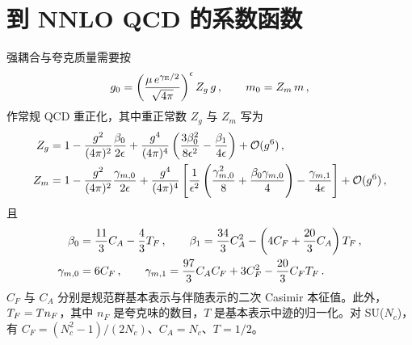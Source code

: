 \section{到 NNLO QCD 的系数函数}\label{sec:coefs}

强耦合与夸克质量需要按
\begin{equation}
  \begin{split}
    g_0 = \left( \frac{\mu \, e^{\gamma_\text{E} / 2}}{\sqrt{4 \pi}}
    \right)^\epsilon Z_g\,g\,,\qquad m_0 = Z_m\,m\,,
    \label{eq:msbar}
  \end{split}
\end{equation}
作常规 QCD 重正化，其中重正常数 $Z_g$ 与 $Z_m$ 写为
\begin{equation}
  \begin{split}
    Z_g &=
    1 - \gcoup{2}\frac{\beta_0}{2\ep} +
    \gcoup{4}\left(\frac{3\beta_0^2}{8\ep^2}
    -\frac{\beta_1}{4\ep}\right)   + \order{g^6}\,,
    \\
    Z_m &=
    1
    -\gcoup{2}\frac{\gamma_{m,0}}{2\ep}
    +\gcoup{4}\left[\frac{1}{\ep^2}\left(
      \frac{\gamma_{m,0}^2}{8} + \frac{\beta_0\gamma_{m,0}}{4}\right)
      -\frac{\gamma_{m,1}}{4\ep}\right] + \order{g^6}\,,
    \label{eq:rgconsts}
  \end{split}
\end{equation}
且
\begin{equation}
  \begin{split}
      \beta_0 &= \frac{11}{3} C_A - \frac{4}{3} T_F\,, \qquad
      \beta_1 = \frac{34}{3} C_A^2 - \left( 4 C_F + \frac{20}{3} C_A
      \right) T_F \,,\\
      \gamma_{m,0} &= 6 C_F\,,\qquad
      \gamma_{m,1} = \frac{97}{3} C_A C_F + 3 C_F^2
      - \frac{20}{3} C_F T_F \,.
    \label{eq:anombg}
  \end{split}
\end{equation}
$C_F$ 与 $C_A$ 分别是规范群基本表示与伴随表示的二次 Casimir 本征值。此外，
$T_F=Tn_F$，其中 $n_F$ 是夸克味的数目，$T$ 是基本表示中迹的归一化。对
SU($N_c$)，有 $C_F=(N_c^2-1)/(2N_c)$、$C_A=N_c$、$T=1/2$。

